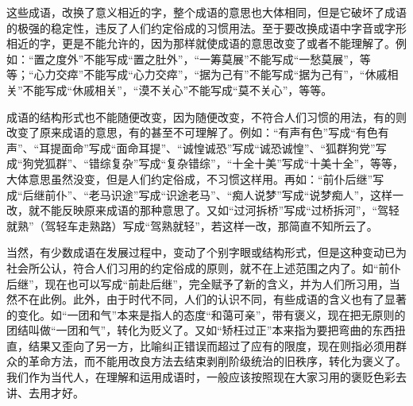 这些成语，改换了意义相近的字，整个成语的意思也大体相同，但是它破坏了成语的极强的稳定性，违反了人们约定俗成的习惯用法。至于要改换成语中字音或字形相近的字，更是不能允许的，因为那样就使成语的意思改变了或者不能理解了。例如：“置之度外”不能写成“置之肚外”，“一筹莫展”不能写成“一愁莫展”，等等；“心力交瘁”不能写成“心力交瘁”，“据为己有”不能写成“据为己有”，“休戚相关”不能写成“休戚相关”，“漠不关心”不能写成“莫不关心”，等等。

成语的结构形式也不能随便改变，因为随便改变，不符合人们习惯的用法，有的则改变了原来成语的意思，有的甚至不可理解了。例如：“有声有色”写成“有色有声”、“耳提面命”写成“面命耳提”、“诚惶诚恐”写成“诚恐诚惶”、“狐群狗党”写成“狗党狐群”、“错综复杂”写成“复杂错综”，“十全十美”写成“十美十全”，等等，大体意思虽然没变，但是人们约定俗成，不习惯这样用。再如：“前仆后继”写成“后继前仆”、“老马识途”写成“识途老马”、“痴人说梦”写成“说梦痴人”，这样一改，就不能反映原来成语的那种意思了。又如“过河拆桥”写成“过桥拆河”，“驾轻就熟”（驾轻车走熟路）写成“驾熟就轻”，若这样一改，那简直不知所云了。
\newpage

当然，有少数成语在发展过程中，变动了个别字眼或结构形式，但是这种变动已为社会所公认，符合人们习用的约定俗成的原则，就不在上述范围之内了。如“前仆后继”，现在也可以写成“前赴后继”，完全赋予了新的含义，并为人们所习用，当然不在此例。此外，由于时代不同，人们的认识不同，有些成语的含义也有了显著的变化。如“一团和气”本来是指人的态度“和蔼可亲”，带有褒义，现在把无原则的团结叫做“一团和气”，转化为贬义了。又如“矫枉过正”本来指为要把弯曲的东西扭直，结果又歪向了另一方，比喻纠正错误而超过了应有的限度，现在则指必须用群众的革命方法，而不能用改良方法去结束剥削阶级统治的旧秩序，转化为褒义了。我们作为当代人，在理解和运用成语时，一般应该按照现在大家习用的褒贬色彩去讲、去用才好。
\newpage